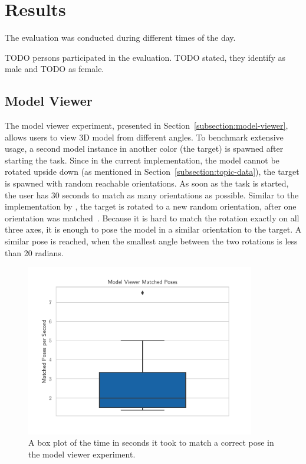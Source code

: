 \section{Results}\label{section:eval-results}

The evaluation was conducted during different times of the day. %


TODO persons participated in the evaluation. TODO stated, they identify as male and TODO as female. 

\subsection{Model Viewer}\label{section:eval-res-mv}

The model viewer experiment, presented in Section~\ref{subsection:model-viewer}, allows users to view \ac{3D} model from different angles. To benchmark extensive usage, a second model instance in another color (the target) is spawned after starting the task. Since in the current implementation, the model cannot be rotated upside down (as mentioned in Section~\ref{subsection:topic-data}), the target is spawned with random reachable orientations.
As soon as the task is started, the user has 30 seconds to match as many orientations as possible. Similar to the implementation by \citeauthor{Katzakis.2010}, the target is rotated to a new random orientation, after one orientation was matched~\cite[140]{Katzakis.2010}.
Because it is hard to match the rotation exactly on all three axes, it is enough to pose the model in a similar orientation to the target. A similar pose is reached, when the smallest angle between the two rotations is less than 20 radians.

\begin{figure}[H]
  \centering
  \includegraphics[width=10cm]{figures/evaluation/eval_exp_mv.pdf}
  \caption[Matched poses per second of the model viewer experiment]{A box plot of the time in seconds it took to match a correct pose in the model viewer experiment.}\label{fig:eval-exp-mv}
\end{figure}


